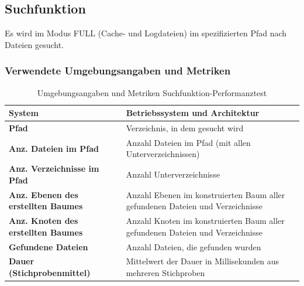 \documentclass[a4paper,12pt]{report}
\begin{document}
    \subsection{Suchfunktion}\label{subsec:testduchfuhrung}
    Es wird im Modus FULL (Cache- und Logdateien) im spezifizierten Pfad nach Dateien gesucht.

    \subsubsection{Verwendete Umgebungsangaben und Metriken}\label{subsubsec:search-perftest-metrics-title}
    \begin{table}[h!]
        \centering
        \setlength{\leftmargini}{0.8cm}
        \begin{tabular}{|p{7cm}|p{7cm}|}
            \hline
            \textbf{System}                                     & Betriebssystem und Architektur                                                 \\ \hline
            \textbf{Pfad}                                       & Verzeichnis, in dem gesucht wird                                               \\ \hline
            \textbf{Anz. Dateien im Pfad}                       & Anzahl Dateien im Pfad (mit allen Unterverzeichnissen)                         \\ \hline
            \textbf{Anz. Verzeichnisse im Pfad}                 & Anzahl Unterverzeichnisse                                                      \\ \hline
            \textbf{Anz. Ebenen \newline des erstellten Baumes} & Anzahl Ebenen im konstruierten Baum aller gefundenen Dateien und Verzeichnisse \\ \hline
            \textbf{Anz. Knoten \newline des erstellten Baumes} & Anzahl Knoten im konstruierten Baum aller gefundenen Dateien und Verzeichnisse \\ \hline
            \textbf{Gefundene Dateien}                          & Anzahl Dateien, die gefunden wurden                                            \\ \hline
            \textbf{Dauer (Stichprobenmittel)}                  & Mittelwert der Dauer in Millisekunden aus mehreren Stichproben                 \\ \hline
        \end{tabular}
        \caption{Umgebungsangaben und Metriken Suchfunktion-Performanztest}\label{tab:perf-search-metrics}
    \end{table}
\end{document}
